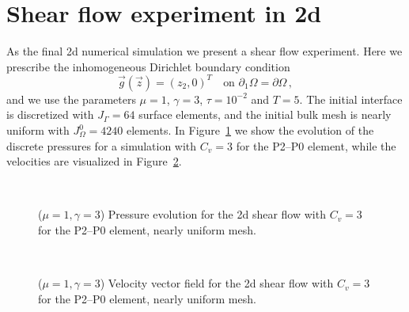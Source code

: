 \section{Shear flow experiment in 2d}\label{sec:stokes_2d_shear}
As the final 2d numerical simulation we present a shear flow experiment. Here
we prescribe the inhomogeneous Dirichlet boundary condition
\begin{equation*}
\vec g(\vec z)=(z_2,0)^T\quad \mbox{on }\partial_1\Omega=\partial\Omega\,,
\end{equation*}
and we use the parameters $\mu=1$, $\gamma=3$, $\tau=10^{-2}$ and $T=5$.
The initial interface is discretized with $J_\Gamma = 64$ surface elements,
and the initial bulk mesh is nearly uniform with $J_\Omega^0 = 4240$ elements.
In Figure~\ref{fig:shear_2d} we show the evolution of the discrete pressures
for a simulation with $C_v=3$ for the P2--P0 element, while the velocities
are visualized in Figure~\ref{fig:shear_2d_velocity}.
\begin{figure}[htbp]
\centering
{}
\\
\caption[Stokes 2d shear flow pressure]
{($\mu=1,\gamma=3$) Pressure evolution for the 2d shear flow with $C_v=3$ for
the P2--P0 element, nearly uniform mesh.}
\label{fig:shear_2d}
\end{figure}
\begin{figure}[htbp]
\centering
{}
\\
\caption[Stokes 2d shear flow velocity]
{($\mu=1,\gamma=3$) Velocity vector field for the 2d shear flow with $C_v=3$
for the P2--P0 element, nearly uniform mesh.}
\label{fig:shear_2d_velocity}
\end{figure}

